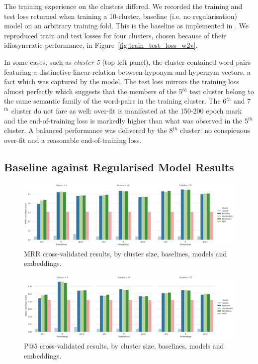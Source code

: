 The training experience on the clusters differed.  We recorded the training and test loss returned when training a 10-cluster, baseline (i.e. no regularisation) model on an arbitrary training fold. This is the \citep{Fu2014} baseline as implemented in \citep{ustalov2017negative}.  We reproduced train and test losses for four clusters, chosen because of their idiosyncratic performance, in Figure~\ref{fig:train_test_loss_w2v}.

In some cases, such as \textit{cluster 5} (top-left panel), the cluster contained word-pairs featuring a distinctive linear relation between hyponym and hypernym vectors, a fact which was captured by the model.  The test loss mirrors the training loss almost perfectly which suggests that the members of the 5$^{th}$ test cluster belong to the same semantic family of the word-pairs in the training cluster.  The 6$^{th}$ and 7$^{th}$ cluster do not fare as well: over-fit is manifested at the 150-200 epoch mark and the end-of-training loss is markedly higher than what was observed in the 5$^{th}$ cluster.  A balanced performance was delivered by the 8$^{th}$ cluster: no conspicuous over-fit and a reasonable end-of-training loss.

\subsection{Baseline against Regularised Model Results}
\begin{figure}[ht!] 
  \centering
  \includegraphics[width=1.\linewidth]{images/MRR_5-fold_results_models_baselines_embeddings.png}
  \caption{MRR cross-validated results, by cluster size, baselines, models and embeddings.}
  \label{fig:MRR_models_baselines}
\end{figure}

\begin{figure}[ht!] 
  \centering
  \includegraphics[width=1.\linewidth]{images/PAt5_5-fold_results_models_baselines_embeddings.png}
  \caption{P$@5$ cross-validated results, by cluster size, baselines, models and embeddings.}
  \label{fig:pat5_models_baselines}
\end{figure}

